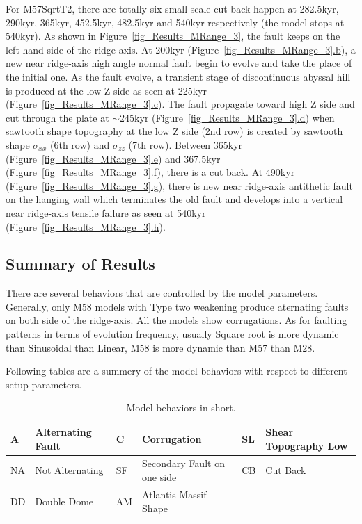 For M57SqrtT2, there are totally six small scale cut back happen at 282.5kyr, 290kyr, 365kyr, 452.5kyr, 482.5kyr and 540kyr respectively (the model stops at 540kyr). As shown in Figure~\hyperref[fig_Results_MRange_3]{\ref{fig_Results_MRange_3}}, the fault keeps on the left hand side of the ridge-axis. At 200kyr (Figure~\hyperref[fig_Results_MRange_3]{\ref{fig_Results_MRange_3}.b}), a new near ridge-axis high angle normal fault begin to evolve and take the place of the initial one. As the fault evolve, a transient stage of discontinuous abyssal hill is produced at the low Z side as seen at 225kyr (Figure~\hyperref[fig_Results_MRange_3]{\ref{fig_Results_MRange_3}.c}). The fault propagate toward high Z side and cut through the plate at $\sim$245kyr (Figure~\hyperref[fig_Results_MRange_3]{\ref{fig_Results_MRange_3}.d}) when sawtooth shape topography at the low Z side (2nd row) is created by sawtooth shape $\sigma_{xx}$ (6th row) and $\sigma_{zz}$ (7th row). Between 365kyr (Figure~\hyperref[fig_Results_MRange_3]{\ref{fig_Results_MRange_3}.e}) and 367.5kyr (Figure~\hyperref[fig_Results_MRange_3]{\ref{fig_Results_MRange_3}.f}), there is a cut back. At 490kyr (Figure~\hyperref[fig_Results_MRange_3]{\ref{fig_Results_MRange_3}.g}), there is new near ridge-axis antithetic fault on the hanging wall which terminates the old fault and develops into a vertical near ridge-axis tensile failure as seen at 540kyr (Figure~\hyperref[fig_Results_MRange_3]{\ref{fig_Results_MRange_3}.h}).


\subsection{Summary of Results}
There are several behaviors that are controlled by the model parameters. Generally, only M58 models with Type two weakening produce aternating faults on both side of the ridge-axis. All the models show corrugations. As for faulting patterns in terms of evolution frequency, usually Square root is more dynamic than Sinusoidal than Linear, M58 is more dynamic than M57 than M28.

Following tables are a summery of the model behaviors with respect to different setup parameters.
 

\begin{table}[h]
\begin{small}
\begin{center}
\begin{tabular}{||l|l||l|l||l|l||}
\hline
A & Alternating Fault & C & Corrugation & SL & Shear Topography Low \\
\hline
NA& Not Alternating & SF & Secondary Fault on one side & CB & Cut Back   \\
\hline
DD &  Double Dome  & AM    & Atlantis Massif Shape &  &   \\
\hline
\end{tabular}
\end{center}
\end{small}
\caption{Model behaviors in short.}
\label{Tab1}
\end{table}

